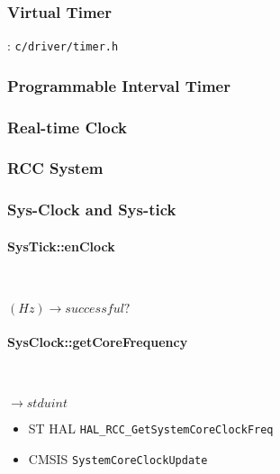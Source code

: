 
\subsubsection{Virtual Timer}
: \verb`c/driver/timer.h`

\subsubsection{Programmable Interval Timer}
\subsubsection{Real-time Clock}

\subsubsection{RCC System}

\subsubsection{Sys-Clock and Sys-tick}

\paragraph{SysTick::enClock} \



$(Hz) \rightarrow successful?$

\paragraph{SysClock::getCoreFrequency} \


$\rightarrow stduint$

\begin{itemize}
	\item ST HAL \verb`HAL_RCC_GetSystemCoreClockFreq`
	\item CMSIS \verb`SystemCoreClockUpdate`
\end{itemize}
